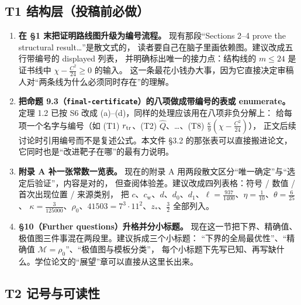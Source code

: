 \documentclass[UTF8,11pt]{ctexart}
\newcommand{\M}{\mathcal{M}}
\newcommand{\cstar}{c_{\mathrm{w}}}
\newcommand{\file}[1]{\texttt{#1}}
\begin{document}
\subsection{T1 结构层（投稿前必做）}

\begin{enumerate}[leftmargin=2em,itemsep=4pt]
\item \textbf{在 \S1 末把证明路线图升级为编号流程。}
现有那段``Sections 2--4 prove the structural result\ldots''是散文式的，
读者要自己在脑子里画依赖图。建议改成五行带编号的 displayed 列表，
并明确标出唯一的接力点：结构线的 $m\le24$ 是证书线中 $\chi-\frac{C^2}{24}\ge0$ 的输入。
这一条最花小钱办大事，因为它直接决定审稿人对``两条线为什么必须同时存在''的理解。

\item \textbf{把命题 9.3（\file{final-certificate}）的八项做成带编号的表或 enumerate。}
定理 1.2 已按 S6 改成 (a)--(d)，同样的处理应该用在八项非负分解上：
给每项一个名字与编号（如 (T1) $r_{\rm tr}$、(T2) $\widehat Q$、\ldots、(T8) $\frac\kappa9(\chi-\frac{C^2}{24})$），
正文后续讨论时引用编号而不是复述公式。本文件 \S3.2 的那张表可以直接搬进论文，
它同时也是``改进靶子在哪''的最有力说明。

\item \textbf{附录 A 补一张常数一览表。}
现在的附录 A 用两段散文区分``唯一确定''与``选定后验证''，内容是对的，
但查阅体验差。建议改成四列表格：符号 / 数值 / 首次出现位置 / 来源类别，
把 $c$、$\cstar$、$d$、$d_0$、$d_1$、$\ell=\frac{937}{1400}$、$\eta=\frac1{10}$、$\theta=\frac6{25}$、
$\kappa=\frac3{125000}$、$\rho_0$、$41503=7^3\cdot11^2$、$z_*$、$\frac32$ 全部列入。

\item \textbf{\S10（Further questions）升格并分小标题。}
现在这一节把下界、精确值、极值图三件事混在两段里。建议拆成三个小标题：
``下界的全局最优性''、``精确值 $\M=\rho_0$''、``极值图与模板分类''，
每个小标题下先写已知、再写缺什么。学位论文的``展望''章可以直接从这里长出来。
\end{enumerate}

\subsection{T2 记号与可读性}
\end{document}
